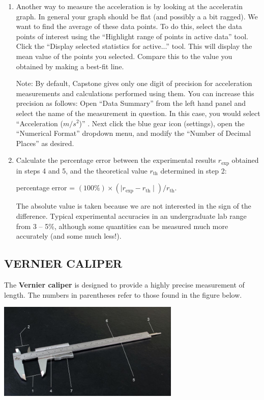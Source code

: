 \begin{enumerate}
\item Another way to measure the acceleration is by looking at the acceleratin graph.  In general your graph should be flat (and possibly a a bit ragged).  We want to find the average of these data points.  To do this, select the data points of interest using the ``Highlight range of points in active data'' tool.  Click the ``Display selected statistics for active...'' tool.  This will display the mean value of the points you selected.  Compare this to the value you obtained by making a best-fit line.

Note:  By default, Capstone gives only one digit of precision for acceleration
measurements and calculations performed using them.  
You can increase this precision as follows:  
Open ``Data Summary'' from the left hand panel 
and select the name of the measurement in question.
In this case, you would select ``Acceleration ($m/s^2$)'' .
Next click the blue gear icon (settings), 
open the ``Numerical Format'' dropdown menu, 
and modify the ``Number of Decimal Places'' as desired.

\item Calculate the percentage error between the experimental results \(r_{\textrm{exp}}\) obtained in steps 4 and 5, and the theoretical value \(r_{\textrm{th}}\) determined in step 2:

percentage error = \( (100\%) \times \left(\mid r_{\textrm{exp}} - r_{\textrm{th}} \mid\right) / r_{\textrm{th}} . \)

The absolute value is taken because we are not interested in the sign of the difference.  Typical experimental accuracies in an undergraduate lab range from 3 -- 5\%, although some quantities can be measured much more accurately (and some much less!).

\end{enumerate}

\subsection*{VERNIER CALIPER}

The \textbf{Vernier caliper} is designed to provide a highly precise measurement of length.  The numbers in parentheses refer to those found in the figure below.
\begin{center} \includegraphics*[width=0.65\textwidth]{imgs/6labs/6Alab/6Aexp2/6A-EXP2-fig7_webtext.jpg} \end{center}


